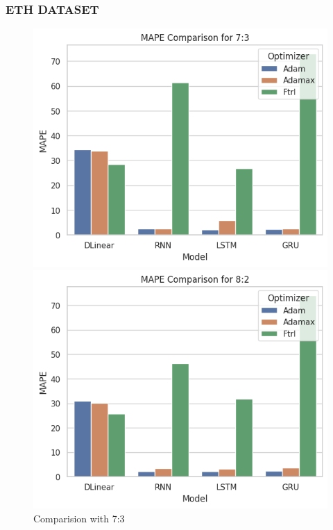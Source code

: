 \documentclass{ieeeojies}
\begin{document}
\subsubsection{ETH DATASET}
\begin{figure}[H]
    \centering
    \begin{minipage}{0.15\textwidth}
    \centering
    \includegraphics[width=1\textwidth]{image/MAPE_73_eth.png}
    \caption{Comparision with 7:3}
    \label{fig:1}
    \end{minipage}
    \hfill
    \begin{minipage}{0.15\textwidth}
    \centering
    \includegraphics[width=1\textwidth]{image/MAPE_82_eth.png}

\end{minipage}
\end{figure}
\end{document}
